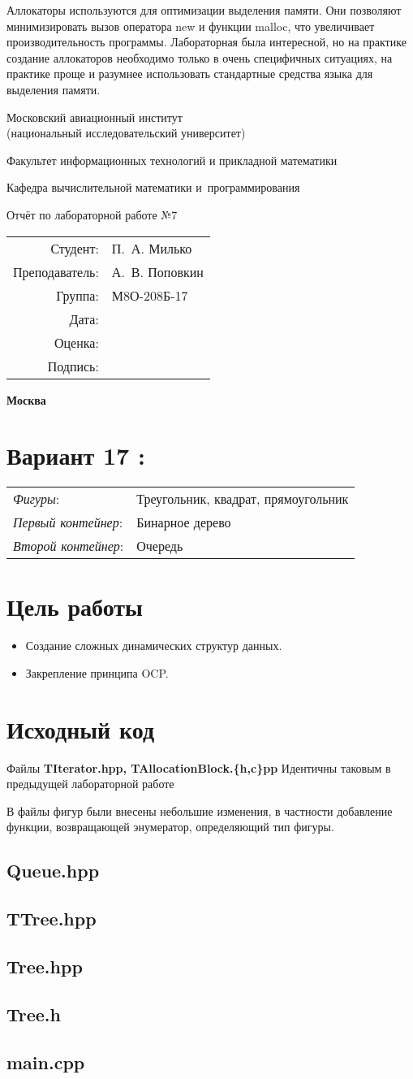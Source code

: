\documentclass[12pt]{article}
\newcommand{\ttitle}[1]{
    \newpage
        \begin{center}
            \bfseries
            
            {\Large Московский авиационный институт\\ (национальный исследовательский университет)
                
            }
            
            \vspace{48pt}
            
            {\large Факультет информационных технологий и прикладной математики
            }
            
            \vspace{36pt}
            
            
            {\large Кафедра вычислительной математики и~программирования
                
            }
            
            
            \vspace{48pt}
            
            Отчёт по лабораторной работе №#1
        
        \end{center}

        \vspace{72pt}

    \begin{flushright}
        \begin{tabular}{rl}
            Студент: & П.\, А. Милько \\
            Преподаватель: & А.\, В. Поповкин \\
            Группа: & М8О-208Б-17 \\
            Дата: & \\
            Оценка: & \\
            Подпись: & \\
        \end{tabular}
    \end{flushright}
    
    \vfill
    
    \begin{center}
        \bfseries
        Москва\\
        \the\year
    \end{center}
    
\pagebreak
}
\newcommand{\se}[1]{\section*{#1}}
\newcommand{\var}{\se{Вариант
    \textbf{\large {17 :}}}
\noindent     \begin{tabular}{ll}
    \textit{Фигуры}: &Треугольник, квадрат, прямоугольник\\
    \textit{Первый контейнер}: &Бинарное дерево \\
    \textit{Второй контейнер}: &Очередь    
    \end{tabular}

}
\newcommand{\lst}[2]{
    \subsection*{\textbf{#2}}
{    \scriptsize
    }
}
\begin{document}
Аллокаторы используются для оптимизации выделения памяти. Они позволяют минимизировать вызов оператора new и функции malloc, что увеличивает производительность программы. Лабораторная была интересной, но на практике создание аллокаторов необходимо только в очень специфичных ситуациях, на практике проще и разумнее использовать стандартные средства языка для выделения памяти.


\ttitle{7}
\var

\se{Цель работы}
\begin{itemize}
	\item  Создание сложных динамических структур данных.
	\item Закрепление принципа OCP.
\end{itemize}

\se{Исходный код}
\noindent
Файлы \textbf{TIterator.hpp, TAllocationBlock.\{h,c\}pp} Идентичны таковым в предыдущей лабораторной работе

В файлы фигур были внесены небольшие изменения, в частности добавление функции, возвращающей энумератор, определяющий тип фигуры.

\lst{lab06/release}{Queue.hpp}
\lst{lab06/release}{TTree.hpp}
\lst{lab06/release}{Tree.hpp}
\lst{lab06/release}{Tree.h}
\lst{lab06/release}{main.cpp}
\end{document}

